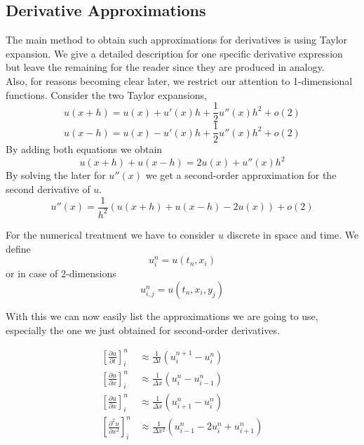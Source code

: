 \documentclass[]{article}
\begin{document}
\subsection{Derivative Approximations} \label{derivate_approx}
The main method to obtain such approximations for derivatives is using Taylor expansion.
We give a detailed description for one specific derivative expression but leave the remaining for the reader since they are produced in analogy.\\
Also, for reasons becoming clear later, we restrict our attention to 1-dimensional functions.
Consider the two Taylor expansions,
\begin{equation*}
u(x+h)=u(x)+u'(x)h+\frac{1}{2}u''(x)h^2+o(2)
\end{equation*}
\begin{equation*}
u(x-h)=u(x)-u'(x)h+\frac{1}{2}u''(x)h^2+o(2)
\end{equation*}
By adding both equations we obtain
\begin{equation*}
u(x+h)+u(x-h)=2u(x)+u''(x)h^2
\end{equation*}
By solving the later for $u''(x)$ we get a second-order approximation for the second derivative
of $u$.
\begin{equation*} 
u''(x)=\frac{1}{h^2}(u(x+h)+u(x-h)-2u(x)) + o(2)
\end{equation*}

For the numerical treatment we have to consider $u$ discrete in space and time.
We define 
\begin{equation*}
u_{i}^{n}=u(t_{n}, x_{i})
\end{equation*}
or in case of 2-dimensions
\begin{equation*}
u_{i,j}^{n}=u(t_{n}, x_{i}, y_{j})
\end{equation*}

With this we can now easily list the approximations we are going to use, especially the one
we just obtained for second-order derivatives.

\begin{eqnarray}
	\left[\frac{\partial u}{\partial t}\right]_{i}^{n} & \approx \frac{1}{\Delta t}(u_{i}^{n+1}-u_{i}^{n}) \nonumber  \\
	\left[\frac{\partial u}{\partial x}\right]_{i}^{n} & \approx \frac{1}{\Delta x}(u_{i}^{n}-u_{i-1}^{n})  \label{backward_in_space} \\
	\left[\frac{\partial u}{\partial x}\right]_{i}^{n} & \approx \frac{1}{\Delta x}(u_{i+1}^{n}-u_{i}^{n}) \label{forward_in_space}  \\
	\left[\frac{\partial^2 u}{\partial x^2}\right]_{i}^{n} & \approx
	\frac{1}{\Delta x^2}(u_{i-1}^{n}-2u_{i}^{n}+u_{i+1}^{n}) \nonumber
\end{eqnarray}
\end{document}
